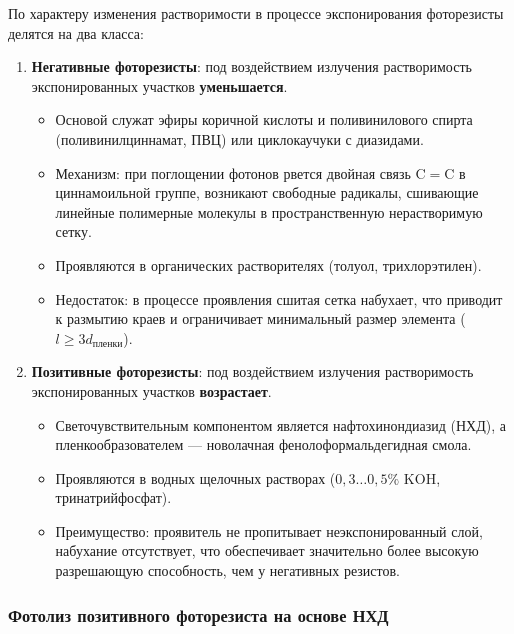 \documentclass[12pt,a4paper]{article}
\theoremstyle{plain}
\theoremstyle{definition}
\theoremstyle{remark}
\numberwithin{equation}{section}
\begin{document}
По характеру изменения растворимости в процессе экспонирования фоторезисты делятся на два класса:
\begin{enumerate}
  \item \textbf{Негативные фоторезисты}: под воздействием излучения растворимость экспонированных 
  участков \textbf{уменьшается}.
  \begin{itemize}
    \item Основой служат эфиры коричной кислоты и поливинилового спирта (поливинилциннамат, ПВЦ) 
    или циклокаучуки с диазидами.
    \item Механизм: при поглощении фотонов рвется двойная связь $\mathrm{C}=\mathrm{C}$ в циннамоильной 
    группе, возникают свободные радикалы, сшивающие линейные полимерные молекулы в пространственную 
    нерастворимую сетку.
    \item Проявляются в органических растворителях (толуол, трихлорэтилен).
    \item Недостаток: в процессе проявления сшитая сетка набухает, что приводит к размытию краев 
    и ограничивает минимальный размер элемента ($l \ge 3 d_\text{пленки}$).
  \end{itemize}
  \item \textbf{Позитивные фоторезисты}: под воздействием излучения растворимость экспонированных 
  участков \textbf{возрастает}.
  \begin{itemize}
    \item Светочувствительным компонентом является нафтохинондиазид (НХД), а пленкообразователем — 
    новолачная фенолоформальдегидная смола.
    \item Проявляются в водных щелочных растворах ($0{,}3 \dots 0{,}5\%$ $\mathrm{KOH}$, тринатрийфосфат).
    \item Преимущество: проявитель не пропитывает неэкспонированный слой, набухание отсутствует, 
    что обеспечивает значительно более высокую разрешающую способность, чем у негативных резистов.
  \end{itemize}
\end{enumerate}

\subsubsection{Фотолиз позитивного фоторезиста на основе НХД}
\end{document}
